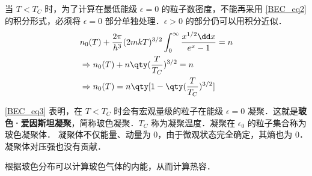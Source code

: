 当 $T<T_C$ 时，为了计算在最低能级 $\epsilon=0$ 的粒子数密度，不能再采用 \autoref{BEC_eq2} 的积分形式，必须将 $\epsilon=0$ 部分单独处理．$\epsilon>0$ 的部分仍可以用积分近似．
\begin{equation}\label{BEC_eq3}
\begin{aligned}
&n_0(T)+\frac{2\pi}{h^3}(2mkT)^{3/2}\int_0^\infty \frac{x^{1/2}\dd x}{e^x-1}=n\\
&\Rightarrow n_0(T)+n\qty(\frac{T}{T_C})^{3/2}=n\\
&\Rightarrow n_0(T)=n\qty[1-\qty(\frac{T}{T_C})^{3/2}]
\end{aligned}
\end{equation}

\autoref{BEC_eq3} 表明，在 $T<T_C$ 时会有宏观量级的粒子在能级 $\epsilon=0$ 凝聚．这就是\textbf{玻色·爱因斯坦凝聚}，简称玻色凝聚．$T_C$ 称为凝聚温度．凝聚在 $\epsilon_0$ 的粒子集合称为玻色凝聚体． 凝聚体不仅能量、动量为 $0$，由于微观状态完全确定，其熵也为 $0$．凝聚体对压强也没有贡献．

根据玻色分布可以计算玻色气体的内能，从而计算热容．